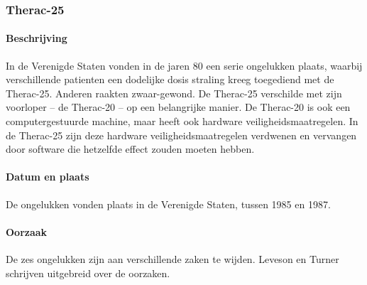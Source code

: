 \documentclass{article}
\begin{document}
			\subsubsection{Therac-25}

				\paragraph{Beschrijving}

				In de Verenigde Staten vonden in de jaren 80 een serie ongelukken plaats, waarbij verschillende patienten een dodelijke dosis straling kreeg toegediend met de Therac-25. Anderen raakten zwaar-gewond. De Therac-25 verschilde met zijn voorloper -- de Therac-20 -- op een belangrijke manier. De Therac-20 is ook een computergestuurde machine, maar heeft ook hardware veiligheidsmaatregelen. In de Therac-25 zijn deze hardware veiligheidsmaatregelen verdwenen en vervangen door software die hetzelfde effect zouden moeten hebben. \cite{thomas1994story} \par

				\paragraph{Datum en plaats}

				De ongelukken vonden plaats in de Verenigde Staten, tussen 1985 en 1987. \par

				\paragraph{Oorzaak}

				De zes ongelukken zijn aan verschillende zaken te wijden. Leveson en Turner schrijven uitgebreid over de oorzaken. \cite{274940} \par
\end{document}
